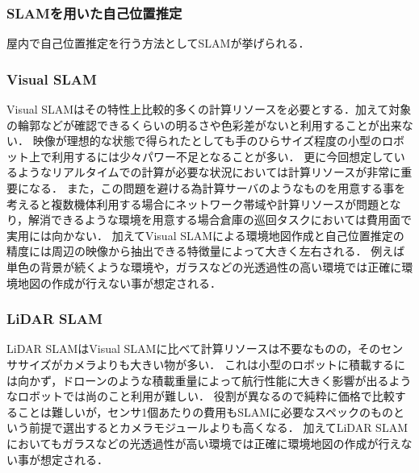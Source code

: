 \subsubsection{SLAMを用いた自己位置推定}
\label{slam_problem}
屋内で自己位置推定を行う方法としてSLAM\cite{slam_mathwork}が挙げられる．

\subsubsection{Visual SLAM}
Visual SLAMはその特性上比較的多くの計算リソースを必要とする．加えて対象の輪郭などが確認できるくらいの明るさや色彩差がないと利用することが出来ない．
映像が理想的な状態で得られたとしても手のひらサイズ程度の小型のロボット上で利用するには少々パワー不足となることが多い．
更に今回想定しているようなリアルタイムでの計算が必要な状況においては計算リソースが非常に重要になる．
また，この問題を避ける為計算サーバのようなものを用意する事を考えると複数機体利用する場合にネットワーク帯域や計算リソースが問題となり，解消できるような環境を用意する場合倉庫の巡回タスクにおいては費用面で実用には向かない．
加えてVisual SLAMによる環境地図作成と自己位置推定の精度には周辺の映像から抽出できる特徴量によって大きく左右される．
例えば単色の背景が続くような環境や，ガラスなどの光透過性の高い環境では正確に環境地図の作成が行えない事が想定される．

\subsubsection{LiDAR SLAM}
LiDAR SLAMはVisual SLAMに比べて計算リソースは不要なものの，そのセンササイズがカメラよりも大きい物が多い．
これは小型のロボットに積載するには向かず，ドローンのような積載重量によって航行性能に大きく影響が出るようなロボットでは尚のこと利用が難しい．
役割が異なるので純粋に価格で比較することは難しいが，センサ1個あたりの費用もSLAMに必要なスペックのものという前提で選出するとカメラモジュールよりも高くなる．
加えてLiDAR SLAMにおいてもガラスなどの光透過性が高い環境では正確に環境地図の作成が行えない事が想定される．